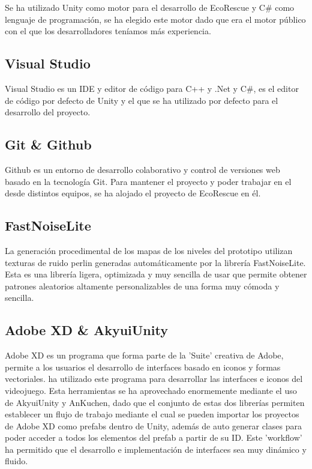 Se ha utilizado Unity\cite{unity} como motor para el desarrollo de EcoRescue y C\#\cite{csharp} como lenguaje de programación, se ha elegido este motor dado que era el motor público con el que los desarrolladores teníamos más experiencia.

\subsection{Visual Studio}

Visual Studio\cite{visualstudio} es un IDE y editor de código para C++ y .Net y C\#, es el editor de código por defecto de Unity y el que se ha utilizado por defecto para el desarrollo del proyecto. 

\subsection{Git \& Github}

Github\cite{github} es un entorno de desarrollo colaborativo y control de versiones web basado en la tecnología Git. Para mantener el proyecto y poder trabajar en el desde distintos equipos, se ha alojado el proyecto de EcoRescue\cite{Repo} en él.

\subsection{FastNoiseLite}

La generación procedimental de los mapas de los niveles del prototipo utilizan texturas de ruido perlin generadas automáticamente por la librería FastNoiseLite\cite{FastNoiseLite}. Esta es una librería ligera, optimizada y muy sencilla de usar que permite obtener patrones aleatorios altamente personalizables de una forma muy cómoda y sencilla.

\subsection{Adobe XD \& AkyuiUnity}

Adobe XD\cite{xd} es un programa que forma parte de la 'Suite' creativa de Adobe, permite a los usuarios el desarrollo de interfaces basado en iconos y formas vectoriales. \nombrecoautorespacio ha utilizado este programa para desarrollar las interfaces e iconos del videojuego. Esta herramientas se ha aprovechado enormemente mediante el uso de AkyuiUnity\cite{AkyuiUnity} y AnKuchen\cite{AnKuchen}, dado que el conjunto de estas dos librerías permiten establecer un flujo de trabajo mediante el cual se pueden importar los proyectos de Adobe XD como prefabs dentro de Unity, además de auto generar clases para poder acceder a todos los elementos del prefab a partir de su ID. Este 'workflow' ha permitido que el desarrollo e implementación de interfaces sea muy dinámico y fluido. 

